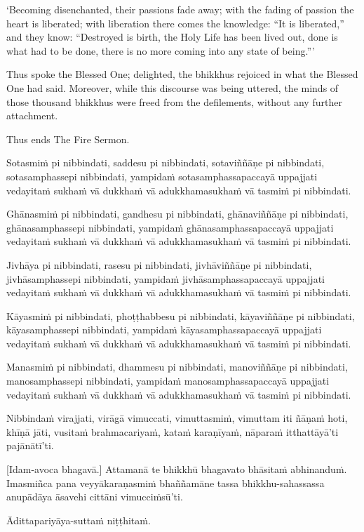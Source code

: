 ‘Becoming disenchanted, their passions fade away; with the fading of
passion the heart is liberated; with liberation there comes the
knowledge: “It is liberated,” and they know: “Destroyed is birth, the
Holy Life has been lived out, done is what had to be done, there is no
more coming into any state of being.”\thinspace ’

\enlargethispage{\baselineskip}

Thus spoke the Blessed One; delighted, the bhikkhus rejoiced in what the
Blessed One had said. Moreover, while this discourse was being uttered, the
minds of those thousand bhikkhus were freed from the defilements,
without any further attachment.

Thus ends The Fire Sermon.

\clearpage

\paliText
\markboth{\paliTitle}{\rightmark}

Sotasmiṁ pi nibbindati, saddesu pi nibbindati, sotaviññāṇe pi
nibbindati, sotasamphassepi nibbindati, yampidaṁ sotasamphassapaccayā
uppajjati vedayitaṁ sukhaṁ vā dukkhaṁ vā adukkhamasukhaṁ vā tasmiṁ pi
nibbindati.

Ghānasmiṁ pi nibbindati, gandhesu pi nibbindati, ghānaviññāṇe pi
nibbindati, ghānasamphassepi nibbindati, yampidaṁ ghānasamphassapaccayā
uppajjati vedayitaṁ sukhaṁ vā dukkhaṁ vā adukkhamasukhaṁ vā tasmiṁ pi
nibbindati.

Jivhāya pi nibbindati, rasesu pi nibbindati, jivhāviññāṇe pi nibbindati,
jivhāsamphassepi nibbindati, yampidaṁ jivhāsamphassapaccayā uppajjati
vedayitaṁ sukhaṁ vā dukkhaṁ vā adukkhamasukhaṁ vā tasmiṁ pi nibbindati.

Kāyasmiṁ pi nibbindati, phoṭṭhabbesu pi nibbindati, kāyaviññāṇe pi
nibbindati, kāyasamphassepi nibbindati, yampidaṁ kāyasamphassapaccayā
uppajjati vedayitaṁ sukhaṁ vā dukkhaṁ vā adukkhamasukhaṁ vā tasmiṁ pi
nibbindati.

Manasmiṁ pi nibbindati, dhammesu pi nibbindati, manoviññāṇe pi
nibbindati, manosamphassepi nibbindati, yampidaṁ manosamphassapaccayā
uppajjati vedayitaṁ sukhaṁ vā dukkhaṁ vā adukkhamasukhaṁ vā tasmiṁ pi
nibbindati.

Nibbindaṁ virajjati, virāgā vimuccati, vimuttasmiṁ, vimuttam iti ñāṇaṁ
hoti, khīṇā jāti, vusitaṁ brahmacariyaṁ, kataṁ karaṇīyaṁ, nāparaṁ
itthattāyā'ti pajānātī'ti.

\enlargethispage{\baselineskip}

[Idam-avoca bhagavā.] Attamanā te bhikkhū bhagavato bhāsitaṁ abhinanduṁ.
Imasmiñca pana veyyākaraṇasmiṁ bhaññamāne tassa bhikkhu-sahassassa
anupādāya āsavehi cittāni vimucciṁsū'ti.

Ādittapariyāya-suttaṁ niṭṭhitaṁ.

\resumeNormalText

